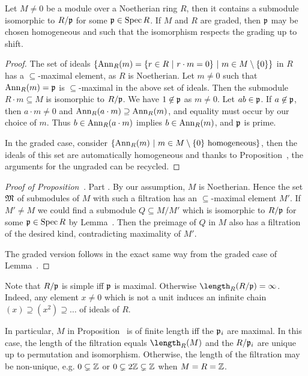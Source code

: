 \documentclass[a4paper,parskip=half,numbers=enddot, DIV=12, headheight=30pt]{scrreprt}
\begin{document}
\begin{lem}
    Let $M\neq0$ be a module over a Noetherian ring $R$,  then it contains a submodule isomorphic to $R/\mathfrak{p}$ for some $\mathfrak{p}\in \operatorname{Spec} R$. If $M$ and $R$ are graded, then $\mathfrak{p}$ may be chosen homogeneous and such that the isomorphism respects the grading up to shift.
\end{lem}
\begin{proof}
    The set of ideals $\left\{\operatorname{Ann}_R(m) = \left\{r\in R\ \middle|\  r\cdot m = 0\right\} \ \middle|\  m\in M\setminus \{0\}\right\}$ in $R$ has a $\subseteq$-maximal element, as $R$ is Noetherian. Let $m\neq 0$ such that $\operatorname{Ann}_R(m) = \mathfrak{p}$ is $\subseteq$-maximal in the above set of ideals. Then the submodule $R\cdot m \subseteq M$ is isomorphic to $R/\mathfrak{p}$. We have $1\not\in \mathfrak{p}$ as $m\neq 0$. Let $ab\in \mathfrak{p}$. If $a\not\in\mathfrak{p}$, then $a\cdot m \neq 0$ and $\operatorname{Ann}_R(a\cdot m)\supseteq \operatorname{Ann}_R(m)$, and equality must occur by our choice of $m$. Thus $b\in \operatorname{Ann}_R(a\cdot m)$ implies $b\in \operatorname{Ann}_R(m)$, and $\mathfrak{p}$ is prime.
    
    In the graded case, consider $\left\{\operatorname{Ann}_R(m)\ \middle|\  m\in M\setminus\{0\}\text{ homogeneous}\right\}$, then the ideals of this set are automatically homogeneous and thanks to Proposition~, the arguments for the ungraded can be recycled.
\end{proof}
\begin{proof}[Proof of Proposition~]
    Part . By our assumption, $M$ is Noetherian. Hence the set $\mathfrak{M}$ of submodules of $M$ with such a filtration has an $\subseteq$-maximal element $M'$. If $M'\neq M$ we could find a submodule $Q\subseteq M/M'$ which is isomorphic to $R/\mathfrak{p}$ for some $\mathfrak{p}\in \operatorname{Spec} R$ by Lemma~. Then the preimage of $Q$ in $M$ also has a filtration of the desired kind, contradicting maximality of $M'$.
    
    The graded version  follows in the exact same way from the graded case of Lemma~.
\end{proof}
\begin{rem*}
    \begin{alphanumerate}
    \item 
        Note that $R/\mathfrak{p}$ is simple iff $\mathfrak{p}$ is maximal. Otherwise $\length_R(R/\pp) = \infty$. Indeed, any element $x\not=0$ which is not a unit induces an infinite chain $(x)\supseteq(x^2)\supseteq\ldots$ of ideals of $R$.
    \item 
        In particular, $M$ in Proposition~ is of finite length iff the $\mathfrak{p}_i$ are maximal. In this case, the length of the filtration equals $\length_R(M)$ and the $R/\mathfrak{p}_i$ are unique up to permutation and isomorphism. Otherwise, the length of the filtration may be non-unique, e.g. $0\subsetneq \mathbb{Z}$ or $0\subsetneq 2\mathbb{Z} \subsetneq \mathbb{Z}$ when $M=R=\mathbb{Z}$.
    \end{alphanumerate}
\end{rem*}
\end{document}
